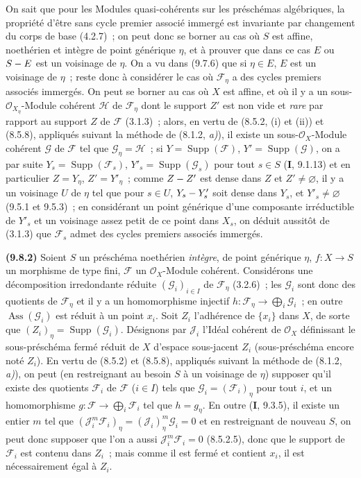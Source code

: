 On sait que pour les Modules quasi-cohérents sur les préschémas algébriques, la
propriété d'être sans cycle premier associé immergé est invariante par
changement du corps de base (4.2.7)~; on peut donc se borner au cas où $S$ est
affine, noethérien et intègre de point générique $\eta$, et à prouver que dans
ce cas $E$ ou $S- E$ est un voisinage de $\eta$. On a vu dans (9.7.6) que si
$\eta\in E$, $E$ est un voisinage de $\eta$~; reste donc à considérer le cas où
$\mathcal F_\eta$ a des cycles premiers associés immergés. On peut se borner au
cas où $X$ est affine, et où il y a un sous-$\mathcal O_{X_\eta}$-Module
cohérent $\mathcal H$ de $\mathcal F_\eta$ dont le support $Z'$ est non vide et
\emph{rare} par rapport au support $Z$ de $\mathcal F$ (3.1.3)~; alors, en vertu
de (8.5.2, (i) et (ii))
et (8.5.8), appliqués suivant la méthode de (8.1.2, \emph{a)}), il existe un
sous-$\mathcal O_X$-Module cohérent $\mathcal G$ de $\mathcal F$ tel que
$\mathcal G_\eta=\mathcal H$~; si $Y=\operatorname{Supp}(\mathcal F)$,
$Y'=\operatorname{Supp}(\mathcal G)$, on a par suite
$Y_s=\operatorname{Supp}(\mathcal F_s)$, $Y'_s=\operatorname{Supp}(\mathcal G_s)$
pour tout $s\in S$ (\textbf{I}, 9.1.13) et en particulier $Z=Y_\eta$,
$Z'=Y'_\eta$~; comme $Z- Z'$ est dense dans $Z$ et $Z'\neq\varnothing$, il y a
un voisinage $U$ de $\eta$ tel que pour $s\in U$, $Y_s- Y'_s$ soit dense dans
$Y_s$, et $Y'_s\neq\varnothing$ (9.5.1 et 9.5.3)~; en considérant un point
générique d'une composante irréductible de $Y'_s$ et un voisinage assez petit de
ce point dans $X_s$, on déduit aussitôt de (3.1.3) que $\mathcal F_s$ admet des
cycles premiers associés immergés.

\label{IV.9.8.2-fr}%
\textbf{(9.8.2)} Soient $S$ un préschéma noethérien \emph{intègre}, de point
générique $\eta$, $f:X\to S$ un morphisme de type fini, $\mathcal F$ un
$\mathcal O_X$-Module cohérent. Considérons une décomposition irredondante
réduite $(\mathcal G_i)_{i\in I}$ de $\mathcal F_\eta$ (3.2.6)~; les
$\mathcal G_i$ sont donc des quotients de $\mathcal F_\eta$ et il y a un
homomorphisme injectif
$h:\mathcal F_\eta\to\bigoplus_i\mathcal G_i$~; en outre
$\operatorname{Ass}(\mathcal G_i)$ est réduit à un point $x_i$. Soit $Z_i$
l'adhérence de $\{x_i\}$ dans $X$, de sorte que
$(Z_i)_\eta=\operatorname{Supp}(\mathcal G_i)$. Désignons par $\mathcal J_i$
l'Idéal cohérent de $\mathcal O_X$ définissant le sous-préschéma fermé réduit de
$X$ d'espace sous-jacent $Z_i$ (sous-préschéma encore noté $Z_i$). En vertu de
(8.5.2) et (8.5.8), appliqués suivant la méthode de (8.1.2, \emph{a)}), on peut
(en restreignant au besoin $S$ à un voisinage de $\eta$) supposer qu'il existe
des quotients $\mathcal F_i$ de $\mathcal F$ ($i\in I$) tels que
$\mathcal G_i=(\mathcal F_i)_\eta$ pour tout $i$, et un homomorphisme
$g:\mathcal F\to\bigoplus_i\mathcal F_i$ tel que $h=g_\eta$. En outre
(\textbf{I}, 9.3.5), il existe un entier $m$ tel que
$(\mathcal J_i^m\mathcal F_i)_\eta=(\mathcal J_i)_\eta^m\mathcal G_i=0$ et en
restreignant de nouveau $S$, on peut donc supposer que l'on a aussi
$\mathcal J_i^m\mathcal F_i=0$ (8.5.2.5), donc que le support de $\mathcal F_i$
est contenu dans $Z_i$~; mais comme il est fermé et contient $x_i$, il est
nécessairement égal à $Z_i$.

